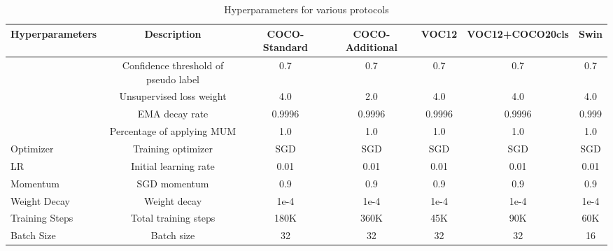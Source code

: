 \documentclass[10pt,twocolumn,letterpaper]{article}
\begin{document}
\begin{table*}[ht]
\caption{Hyperparameters for various protocols}
\centering
\begin{adjustbox}{width=1.0\linewidth}
\begin{tabular}{|l|c|c|c|c|c|c|}
\hline
\multicolumn{1}{|c|}{Hyperparameters} & \multicolumn{1}{|c|}{Description} & \multicolumn{1}{|c|}{COCO-Standard} & \multicolumn{1}{|c|}{COCO-Additional} & 
\multicolumn{1}{|c|}{VOC12} & \multicolumn{1}{|c}{VOC12+COCO20cls} & \multicolumn{1}{|c|}{Swin} \\ \hline
 & Confidence threshold of pseudo label & 0.7 & 0.7 & 0.7 & 0.7 & 0.7 \\
     & Unsupervised loss weight      & 4.0 & 2.0 & 4.0 & 4.0 & 4.0     \\
    &   EMA decay rate  & 0.9996 & 0.9996 & 0.9996 & 0.9996 & 0.999 \\
   & Percentage of applying MUM & 1.0 & 1.0 & 1.0 & 1.0 & 1.0 \\
Optimizer & Training optimizer & SGD & SGD & SGD & SGD & SGD \\
LR     & Initial learning rate & 0.01 & 0.01 & 0.01 & 0.01 & 0.01 \\ 
Momentum     & SGD momentum & 0.9 & 0.9 & 0.9 & 0.9 & 0.9 \\ 
Weight Decay     & Weight decay & 1e-4 & 1e-4 & 1e-4 & 1e-4 & 1e-4 \\ 
Training Steps     & Total training steps & 180K  & 360K  & 45K  & 90K & 60K \\ 
Batch Size     & Batch size & 32 & 32 & 32 & 32 & 16 \\ 
\hline
\end{tabular}
\end{adjustbox}
\label{tab:hyperparam}
\end{table*}
\end{document}
